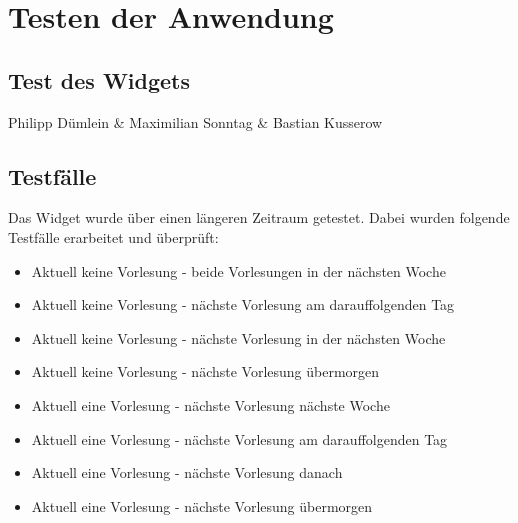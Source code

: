 \chapter{Testen der Anwendung}
\section{Test des Widgets}
Philipp Dümlein \& Maximilian Sonntag \& Bastian Kusserow

\section{Testfälle}
Das Widget wurde über einen längeren Zeitraum getestet. Dabei wurden folgende Testfälle erarbeitet und überprüft:

\begin{itemize}
\item Aktuell keine Vorlesung - beide Vorlesungen in der nächsten Woche
\item Aktuell keine Vorlesung - nächste Vorlesung am darauffolgenden Tag
\item Aktuell keine Vorlesung - nächste Vorlesung in der nächsten Woche
\item Aktuell keine Vorlesung - nächste Vorlesung übermorgen
\item Aktuell eine Vorlesung - nächste Vorlesung nächste Woche
\item Aktuell eine Vorlesung - nächste Vorlesung am darauffolgenden Tag
\item Aktuell eine Vorlesung - nächste Vorlesung danach
\item Aktuell eine Vorlesung - nächste Vorlesung übermorgen
\end{itemize}

